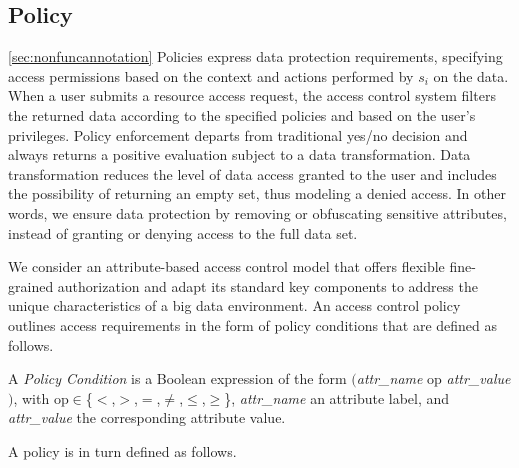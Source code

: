 \subsection{Policy}\ref{sec:nonfuncannotation}
Policies express data protection requirements, specifying access permissions based on the context and actions performed by $s_i$ on the data.
When a user submits a resource access request, the access control system filters the returned data according to the specified policies and based on the user's privileges. Policy enforcement departs from traditional yes/no decision and always returns a positive evaluation subject to a data transformation. Data transformation reduces the level of data access granted to the user and includes the possibility of returning an empty set, thus modeling a denied access.
In other words, we ensure data protection by removing or obfuscating sensitive attributes, instead of granting or denying access to the full data set.

We consider an attribute-based access control model that offers flexible fine-grained authorization and adapt its standard key components to address the unique characteristics of a big data environment.
An access control policy outlines access requirements in the form of policy conditions that are defined as follows.

\begin{definition}\label{def:policy_cond}
  A \emph{Policy Condition} is a Boolean expression of the form $($\emph{attr\_name} op \emph{attr\_value}$)$, with op$\in$\{$<$,$>$,$=$,$\neq$,$\leq$,$\geq$\}, \emph{attr\_name} an attribute label, and \emph{attr\_value} the corresponding attribute value.
\end{definition}

A policy is in turn defined as follows.

